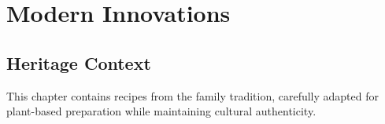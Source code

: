 \chapter{Modern Innovations}

\section*{Heritage Context}

This chapter contains recipes from the family tradition, carefully adapted for plant-based preparation while maintaining cultural authenticity.

% 

